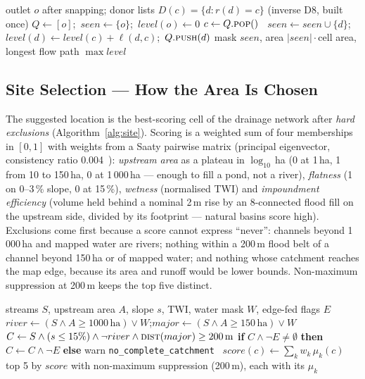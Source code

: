 \documentclass[manuscript,screen,review]{acmart}
\begin{document}
\begin{algorithm}[h]
\caption{Catchment of a pour point --- reverse BFS, $O(\text{catchment size})$}\label{alg:bfs}
\small
\begin{algorithmic}[1]
\Require outlet $o$ after snapping; donor lists $D(c)=\{d : r(d)=c\}$ (inverse D8, built once)
\State $Q\gets[o]$;\ $seen\gets\{o\}$;\ $level(o)\gets 0$
  \State $c\gets Q.\textsc{pop}()$
  \ $seen\gets seen\cup\{d\}$;\ $level(d)\gets level(c)+\ell(d,c)$;\ $Q.\textsc{push}(d)$\EndFor
\EndWhile
\State \Return mask $seen$, area $|seen|\cdot$cell area, longest flow path $\max level$
\end{algorithmic}
\end{algorithm}

\subsection{Site Selection --- How the Area Is Chosen}
The suggested location is the best-scoring cell of the drainage network after \emph{hard
exclusions} (Algorithm~\ref{alg:site}). Scoring is a weighted sum of four memberships in
$[0,1]$ with weights from a Saaty pairwise matrix (principal eigenvector, consistency ratio
0.004~\cite{saaty1980}): \emph{upstream area} as a plateau in $\log_{10}$\,ha (0 at 1\,ha,
1 from 10 to 150\,ha, 0 at 1\,000\,ha --- enough to fill a pond, not a river), \emph{flatness}
(1 on 0--3\,\% slope, 0 at 15\,\%), \emph{wetness} (normalised TWI) and \emph{impoundment
efficiency} (volume held behind a nominal 2\,m rise by an 8-connected flood fill on the
upstream side, divided by its footprint --- natural basins score high). Exclusions come first
because a score cannot express ``never'': channels beyond 1\,000\,ha and mapped water are
rivers; nothing within a 200\,m flood belt of a channel beyond 150\,ha or of mapped water; and
nothing whose catchment reaches the map edge, because its area and runoff would be lower
bounds. Non-maximum suppression at 200\,m keeps the top five distinct.

\begin{algorithm}[h]
\caption{Pond site selection (terrain MCDA with hard exclusions)}\label{alg:site}
\small
\begin{algorithmic}[1]
\Require streams $S$, upstream area $A$, slope $s$, TWI, water mask $W$, edge-fed flags $E$
\State $river \gets (S \land A\ge 1000\,\text{ha}) \lor W$;\quad $major\gets (S\land A\ge 150\,\text{ha})\lor W$
\State $C\gets S \land (s\le 15\%) \land \lnot river \land \textsc{dist}(major) \ge 200\,\text{m}$ 
\State \textbf{if} $C\land\lnot E\ne\emptyset$ \textbf{then} $C\gets C\land\lnot E$ \textbf{else} warn \texttt{no\_complete\_catchment}
\ $score(c)\gets\sum_k w_k\, \mu_k(c)$ \EndFor
\State \Return top 5 by $score$ with non-maximum suppression (200\,m), each with its $\mu_k$
\end{algorithmic}
\end{algorithm}
\end{document}
